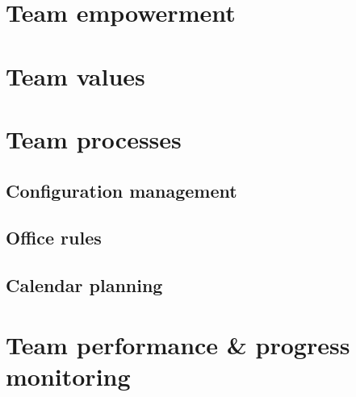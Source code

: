 \documentclass[a4paper,11pt]{article}
\begin{document}
\section{Team empowerment} %
\label{sec:team_empowerment}



\section{Team values} %
\label{sec:team_values}


\section{Team processes} %
\label{sec:team_processes}

\subsection{Configuration management} %
\label{subsec:configuration_management}


\subsection{Office rules} %
\label{subsec:office_rules}


\subsection{Calendar planning} %
\label{subsec:calendar_planning}



\section{Team performance \& progress monitoring} %
\label{sec:team_performance_progress_monitoring}

\end{document}
